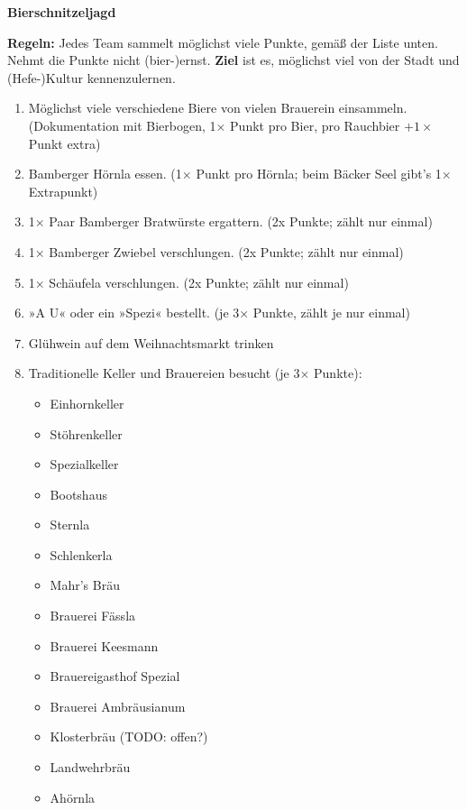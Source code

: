 \documentclass[a5paper,ngerman]{scrartcl}
\begin{document}
{%
\Huge
\begin{center}
\textbf{Bierschnitzeljagd}
\end{center}
}%

\textbf{Regeln:} Jedes Team sammelt möglichst viele Punkte, gemäß der Liste
unten. Nehmt die Punkte nicht (bier-)ernst. \textbf{Ziel} ist es, möglichst viel von der
Stadt und (Hefe-)Kultur kennenzulernen.

\begin{enumerate}
\setlength\itemsep{0em}
\item Möglichst viele verschiedene Biere von vielen Brauerein einsammeln. (Dokumentation mit Bierbogen, 1$\times$ Punkt pro Bier, pro Rauchbier $+1\times$ Punkt extra)
\item Bamberger Hörnla essen. (1$\times$ Punkt pro Hörnla; beim Bäcker Seel gibt's 1$\times$ Extrapunkt)
\item 1$\times$ Paar Bamberger Bratwürste ergattern. (2x Punkte; zählt nur einmal)
\item 1$\times$ Bamberger Zwiebel verschlungen. (2x Punkte; zählt nur einmal)
\item 1$\times$ Schäufela verschlungen. (2x Punkte; zählt nur einmal)
\item »A U« oder ein »Spezi« bestellt. (je 3$\times$ Punkte, zählt je nur einmal)
\item Glühwein auf dem Weihnachtsmarkt trinken
\item Traditionelle Keller und Brauereien besucht (je 3$\times$ Punkte):
    \begin{multicols}{2}
    \begin{itemize}
    \item Einhornkeller
    \item Stöhrenkeller
    \item Spezialkeller
    \item Bootshaus
    \item Sternla
    \item Schlenkerla
    \item Mahr's Bräu
    \item Brauerei Fässla
    \item Brauerei Keesmann
    \item Brauereigasthof Spezial
    \item Brauerei Ambräusianum
    \item Klosterbräu (TODO: offen?)
    \item Landwehrbräu
    \item Ahörnla
    \end{itemize}

\end{multicols}
\end{enumerate}
\end{document}
